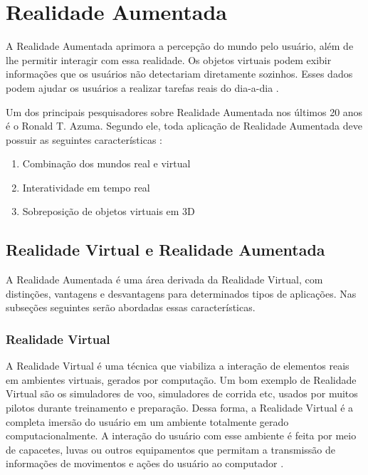 \chapter{Realidade Aumentada}
\label{chapter:principios_ra}



A Realidade Aumentada aprimora a percepção do mundo pelo usuário, além de
lhe permitir interagir com essa realidade. Os objetos virtuais podem 
exibir informações que os usuários não detectariam diretamente sozinhos.
Esses dados podem ajudar os usuários a realizar tarefas reais do dia-a-dia
\cite{SurveyAR}.


Um dos principais pesquisadores sobre Realidade Aumentada nos últimos 20 anos
é o Ronald T. Azuma. Segundo ele, toda aplicação de Realidade Aumentada deve possuir
as seguintes características \cite{SurveyAR}:


\begin{enumerate}
    \item Combinação dos mundos real e virtual
    \item Interatividade em tempo real
    \item Sobreposição de objetos virtuais em 3D
\end{enumerate}







\section{Realidade Virtual e Realidade Aumentada}

A Realidade Aumentada é uma área derivada da Realidade Virtual, com distinções,
vantagens e desvantagens para determinados tipos de aplicações. Nas subseções 
seguintes serão abordadas essas características.


\subsection{Realidade Virtual}


A Realidade Virtual é uma técnica que viabiliza a interação de elementos reais em ambientes
virtuais, gerados por computação. 
Um bom exemplo de Realidade Virtual são os simuladores de voo, simuladores de corrida etc, usados
por muitos pilotos durante treinamento e preparação.
Dessa forma, a Realidade Virtual é a completa imersão do usuário em um ambiente totalmente
gerado computacionalmente. A interação do usuário com esse ambiente é feita por meio de capacetes,
luvas ou outros equipamentos que permitam a transmissão de informações de movimentos e ações 
do usuário ao computador \cite{ARColaborativa}.


